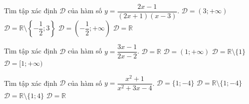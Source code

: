 \begin{ex}
\begin{ex}%
    Tìm tập xác định $\mathscr{D}$ của hàm số $y=\dfrac{2x-1}{(2x+1)(x-3)}$.
    \choice
    {$\mathscr{D}=(3;+\infty)$}
    {\True $\mathscr{D}=\mathbb{R}\setminus\left\{-\dfrac{1}{2};3\right\}$}
    {$\mathscr{D}=\left(-\dfrac{1}{2};+\infty\right)$}
    {$\mathscr{D}=\mathbb{R}$}
\end{ex}

\begin{ex}%
    Tìm tập xác định $\mathscr{D}$ của hàm số $y=\dfrac{3x-1}{2x-2}$.
    \choice
    {$\mathscr{D}=\mathbb{R}$}
    {$\mathscr{D}=(1;+\infty)$}
    {\True $\mathscr{D}=\mathbb{R}\setminus\{1\}$}
    {$\mathscr{D}=[1;+\infty)$}
\end{ex}

\begin{ex}%
    Tìm tập xác định $\mathscr{D}$ của hàm số $y=\dfrac{x^2+1}{x^2+3x-4}$.
    \choice
    {$\mathscr{D}=\{1;-4\}$}
    {\True $\mathscr{D}=\mathbb{R}\setminus\{1;-4\}$}
    {$\mathscr{D}=\mathbb{R}\setminus\{1;4\}$}
    {$\mathscr{D}=\mathbb{R}$}
\end{ex}


\end{ex}
